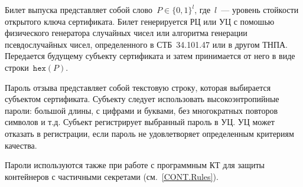 Билет выпуска представляет собой слово~$P\in\{0,1\}^l$,
где~$l$~--- уровень стойкости открытого ключа сертификата.
%
Билет генерируется РЦ или УЦ с помошью физического генератора 
случайных чисел или алгоритма генерации псевдослучайных чисел, 
определенного в СТБ~34.101.47 или в другом ТНПА. 
%
Передается будущему субъекту сертификата и затем принимается от него
в виде строки~$\texttt{hex}(P)$. 

Пароль отзыва представляет собой текстовую строку, которая выбирается 
субъектом сертификата. Субъекту следует использовать  
высокоэнтропийные пароли: большой длины, с цифрами и буквами, 
без многократных повторов символов и т.д.
%
Субъект регистрирует выбранный пароль в УЦ. УЦ может отказать в регистрации, 
если пароль не удовлетворяет определенным критериям качества. 

Пароли используются также при работе с программным КТ для защиты 
контейнеров с частичными секретами (см.~\ref{CONT.Rules}).

